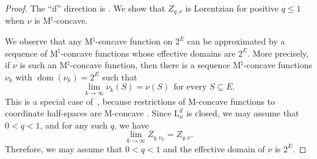 \documentclass{amsart}
\theoremstyle{definition}
\theoremstyle{remark}
\DeclareMathOperator{\dom}{{dom}}          %
\newcommand{\1}{\mathbf{1}}
\newcommand{\Mnat}{$\text{M}^\natural$}
\numberwithin{equation}{section}
\begin{document}
\begin{proof}
The ``if'' direction is \cite[Proposition 5.5]{EH20}. We show that $Z_{q,\nu}$ is Lorentzian for positive $q \le 1$ when $\nu$ is \Mnat-concave.

We observe that any \Mnat-concave function on $2^E$ can be approximated by a sequence of \Mnat-concave functions whose effective domains are $2^E$. More precisely, if $\nu$ is such an \Mnat-concave function, then there is a sequence \Mnat-concave functions $\nu_k$ with $\dom (\nu_k)=2^{E}$ such that 
\[
\lim_{k\to \infty} \nu_k(S) = \nu(S) \ \ \text{for every $S \subseteq E$.}
\]
This is a special case of~\cite[Lemma 3.27]{BH20}, because 
restrictions of M-concave functions to coordinate half-spaces are M-concave \cite[Section 6.4]{Mu03}.
 Since $\mathrm{L}^d_n$ is closed, we may assume that $0<q<1$, and for any such $q$, we have
\[
 \lim\limits_{k\to \infty} Z_{q,\nu_k} = Z_{q,\nu}.
\]
Therefore, we may assume that $0<q<1$ and the effective domain of $\nu$ is $2^{E}$.


\end{proof}
\end{document}

